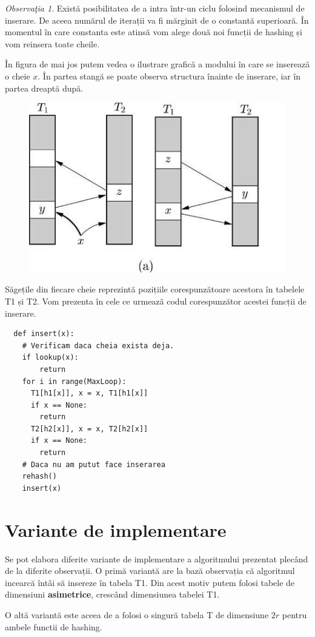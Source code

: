 \documentclass[a4paper]{article}
\theoremstyle{remark}
\newtheorem{remark}{Observa\c{t}ia}
\theoremstyle{definition}
\begin{document}
\begin{remark}Există posibilitatea de a intra într-un ciclu folosind mecanismul de inserare. De aceea numărul de iterații va fi mărginit de o constantă superioară. În momentul în care constanta este atinsă vom alege două noi funcții de hashing și vom reinsera toate cheile.
\end{remark}

În figura de mai jos putem vedea o ilustrare grafică a modului în care se inserează o cheie $x$. În partea stangă se poate observa structura înainte de inserare, iar în partea dreaptă după.

\begin{figure}[h]
\includegraphics[width=0.4\linewidth]{cuckoo.jpg}
\end{figure}

Săgețile din fiecare cheie reprezintă pozițiile corespunzătoare acestora în tabelele T1 și T2. Vom prezenta în cele ce urmează codul corespunzător acestei funcții de inserare.

\begin{verbatim}
  def insert(x):
  	# Verificam daca cheia exista deja.
  	if lookup(x):
  		return
   	for i in range(MaxLoop):
   	  T1[h1[x]], x = x, T1[h1[x]]
   	  if x == None:
   	    return
   	  T2[h2[x]], x = x, T2[h2[x]]
   	  if x == None:
   	    return
   	# Daca nu am putut face inserarea
   	rehash()
   	insert(x)
\end{verbatim}

\section{Variante de implementare}

Se pot elabora diferite variante de implementare a algoritmului prezentat plecând de la diferite observații. O primă variantă are la bază observația că algoritmul incearcă întâi să insereze în tabela T1. Din acest motiv putem folosi tabele de dimensiuni \textbf{asimetrice}, crescând dimensiunea tabelei T1.

O altă variantă este aceea de a folosi o singură tabela T de dimensiune $2r$ pentru ambele functii de hashing.
\end{document}
